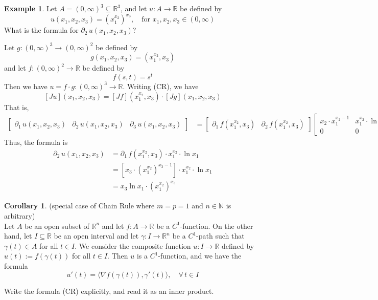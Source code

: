 \documentclass[11pt]{article}
\makeatletter
\theoremstyle{definition}
\newtheorem{exmp}[thm]{Example}
\newtheorem{cor}[thm]{Corollary}
\newcommand{\N}{\ensuremath{\mathbb{N}}}
\newcommand{\R}{\ensuremath{\mathbb{R}}}
\newenvironment{pf}[1][\proofname]{\par
  \pushQED{\qed}%
  \normalfont \topsep0\p@\relax
  \trivlist
  \item[\hskip\labelsep\itshape
  #1\@addpunct{.}]\ignorespaces
}{%
  \popQED\endtrivlist\@endpefalse
}
\makeatother
\begin{document}
\begin{exmp}
Let $A = (0, \infty)^3 \subseteq \R^3$, and let $u : A \to \R$ be defined by
$$u(x_1, x_2, x_3) = (x_1^{x_2})^{x_3}, \quad \text{for } x_1, x_2, x_3 \in (0, \infty)$$
What is the formula for $\partial_2\,u(x_1, x_2, x_3)$?

Let $g : (0, \infty)^3 \to (0, \infty)^2$ be defined by 
$$g(x_1, x_2, x_3) = (x_1^{x_2}, x_3)$$
and let $f : (0, \infty)^2 \to \R$ be defined by
$$f(s, t) = s^t$$
Then we have $u = f \cdot g : (0, \infty)^3 \to \R$. Writing (CR), we have 
$$[Ju](x_1, x_2, x_3) = [Jf](x_1^{x_2}, x_3) \cdot [Jg](x_1, x_2, x_3)$$
That is,
\begin{align*}
\begin{bmatrix} \partial_1\,u(x_1, x_2, x_3) & \partial_2\,u(x_1, x_2, x_3) & \partial_3\,u(x_1, x_2, x_3) \end{bmatrix} 
&= \begin{bmatrix} \partial_1\,f(x_1^{x_2}, x_3) & \partial_2\,f(x_1^{x_2}, x_3) \end{bmatrix} \begin{bmatrix} x_2 \cdot x_1^{x_2 - 1} & x_1^{x_2} \cdot \ln x_1 & 0 \\ 0 & 0 & 1 \end{bmatrix} 
\end{align*}
Thus, the formula is
\begin{align*}
\partial_2\,u(x_1, x_2, x_3) &= \partial_1\,f(x_1^{x_2}, x_3) \cdot x_1^{x_2} \cdot \ln x_1 \\
&= [x_3 \cdot (x_1^{x_2})^{x_3-1}] \cdot x_1^{x_2} \cdot \ln x_1 \\
&= x_3 \ln x_1 \cdot (x_1^{x_2})^{x_3}
\end{align*}
\end{exmp}

\begin{cor}(special case of Chain Rule where $m=p=1$ and $n \in \N$ is arbitrary)~ \\
Let $A$ be an open subset of $\R^n$ and let $f : A \to \R$ be a $C^1$-function. On the other hand, let $I \subseteq \R$ be an open interval and let $\gamma : I \to \R^n$ be a $C^1$-path such that $\gamma(t) \in A$ for all $t \in I$. We consider the composite function $u : I \to \R$ defined by $u(t) := f(\gamma(t))$ for all $t \in I$. Then $u$ is a $C^1$-function, and we have the formula
$$u'(t) = \langle \nabla f(\gamma(t)), \gamma'(t) \rangle, \quad \forall \, t \in I$$
\begin{pf}
Write the formula (CR) explicitly, and read it as an inner product.
\end{pf}
\end{cor}
\end{document}
